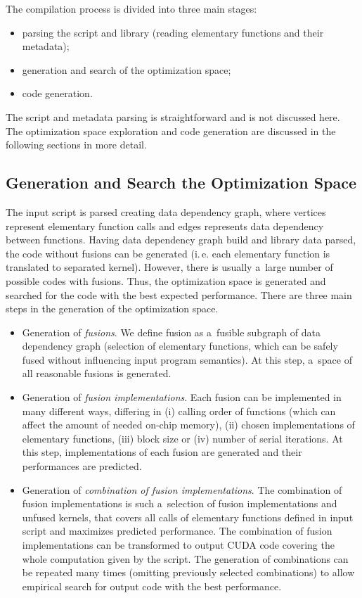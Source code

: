 \documentclass[final]{siamltex}
\def\ie{i.\,e.}
\begin{document}
{The compilation process is divided into three main stages:
\begin{itemize}
        \item parsing the script and library (reading elementary functions and their metadata);
        \item generation and search of the optimization space;
        \item code generation.
\end{itemize}

The script and metadata parsing is straightforward and is not discussed here. The optimization space exploration and code generation are discussed in the following sections in more detail.

\subsection{Generation and Search the Optimization Space}
\label{sect:statespace_overview}

The input script is parsed creating data dependency graph, where vertices represent elementary function calls and edges represents data dependency between functions. Having data dependency graph build and library data parsed, the code without fusions can be generated (\ie{} each elementary function is translated to separated kernel). However, there is usually a~large number of possible codes with fusions. Thus, the optimization space is generated and searched for the code with the best expected performance. There are three main steps in the generation of the optimization space.
\begin{itemize}
        \item Generation of \textit{fusions}. We define fusion as a~fusible subgraph of data dependency graph (selection of elementary functions, which can be safely fused without influencing input program semantics). At this step, a~space of all reasonable fusions is generated.
        \item Generation of \textit{fusion implementations}. Each fusion can be implemented in many different ways, differing in (i) calling order of functions (which can affect the amount of needed on-chip memory), (ii) chosen implementations of elementary functions, (iii) block size or (iv) number of serial iterations. At this step, implementations of each fusion are generated and their performances are predicted.
        \item Generation of \textit{combination of fusion implementations}. The combination of fusion implementations is such a~selection of fusion implementations and unfused kernels, that covers all calls of elementary functions defined in input script and maximizes predicted performance. The combination of fusion implementations can be transformed to output CUDA code covering the whole computation given by the script. The generation of combinations can be repeated many times (omitting previously selected combinations) to allow empirical search for output code with the best performance.
\end{itemize}

}
\end{document}
